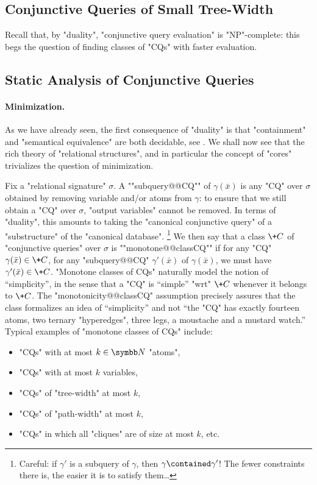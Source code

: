 \subsection{Conjunctive Queries of Small Tree-Width}

Recall that, by "duality", "conjunctive query evaluation" is "NP"-complete:
this begs the question of finding classes of "CQs" with faster evaluation.
\todo{}

\subsection{Static Analysis of Conjunctive Queries}

\paragraph*{Minimization.}
As we have already seen, the first consequence of "duality" is that
"containment" and "semantical equivalence" are both
decidable, see .
We shall now see that the rich theory of "relational structures",
and in particular the concept of "cores" trivializes the question of minimization.

Fix a "relational signature" $\sigma$.
A ""subquery@@CQ"" of $\gamma(\bar x)$ is any "CQ" over $\sigma$
obtained by removing variable and/or atoms from $\gamma$:
to ensure that we still obtain a "CQ" over $\sigma$, "output variables" 
cannot be removed.
In terms of "duality", this amounts to taking the "canonical conjunctive query" of
a "substructure" of the "canonical database".%
\footnote{Careful: if $\gamma'$ is a subquery of $\gamma$, then $\gamma \contained \gamma'$!
The fewer constraints there is, the easier it is to satisfy them…}
We then say that a class $\+C$ of "conjunctive queries" over $\sigma$ is ""monotone@@classCQ""
if for any "CQ" $\gamma(\bar x) \in \+C$, for any "subquery@@CQ" $\gamma'(\bar x)$ of
$\gamma(\bar x)$, we must have $\gamma'(\bar x) \in \+C$.
"Monotone classes of CQs" naturally model the notion of ``simplicity'', in the sense that
a "CQ" is ``simple'' "wrt" $\+C$ whenever it belongs to $\+C$. The "monotonicity@@classCQ"
assumption precisely assures that the class formalizes an idea of ``simplicity''
and not ``the "CQ" has exactly fourteen atoms, two ternary "hyperedges", three legs,
a moustache and a mustard watch.''
Typical examples of "monotone classes of CQs" include:
\begin{itemize}
	\item "CQs" with at most $k \in \N$ "atoms",
	\item "CQs" with at most $k$ variables,
	\item "CQs" of "tree-width" at most $k$,
	\item "CQs" of "path-width" at most $k$,
	\item "CQs" in which all "cliques" are of size at most $k$, etc.
\end{itemize}

